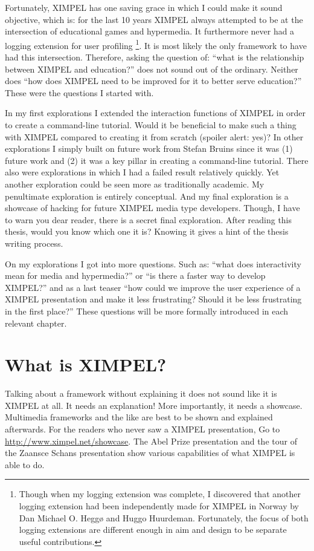 Fortunately, XIMPEL has one saving grace in which I could make it sound objective, which is: for the last 10 years XIMPEL always attempted to be at the intersection of educational games and hypermedia. It furthermore never had a logging extension for user profiling
\footnote{Though when my logging extension was complete, I discovered that another logging extension had been independently made for XIMPEL in Norway by Dan Michael O. Heggø and Huggo Huurdeman. Fortunately, the focus of both logging extensions are different enough in aim and design to be separate useful contributions.}. 
It is most likely the only framework to have had this intersection. Therefore, asking the question of: ``what is the relationship between XIMPEL and education?'' does not sound out of the ordinary. Neither does ``how does XIMPEL need to be improved for it to better serve education?'' These were the questions I started with. 

In my first explorations I extended the interaction functions of XIMPEL in order to create a command-line tutorial. Would it be beneficial to make such a thing with XIMPEL compared to creating it from scratch (spoiler alert: yes)? In other explorations I simply built on future work from Stefan Bruins since it was (1) future work and (2) it was a key pillar in creating a command-line tutorial. There also were explorations in which I had a failed result relatively quickly. Yet another exploration could be seen more as traditionally academic. My penultimate exploration is entirely conceptual. And my final exploration is a showcase of hacking for future XIMPEL media type developers. Though, I have to warn you dear reader, there is a secret final exploration. After reading this thesis, would you know which one it is? Knowing it gives a hint of the thesis writing process.

On my explorations I got into more questions. Such as: ``what does interactivity mean for media and hypermedia?'' or ``is there a faster way to develop XIMPEL?'' and as a last teaser ``how could we improve the user experience of a XIMPEL presentation and make it less frustrating? Should it be less frustrating in the first place?'' These questions will be more formally introduced in each relevant chapter. 

\section{What is XIMPEL?}
Talking about a framework without explaining it does not sound like it is XIMPEL at all. It needs an explanation! More importantly, it needs a showcase. Multimedia frameworks and the like are best to be shown and explained afterwards. For the readers who never saw a XIMPEL presentation, Go to \href{ximpel.net/showcase}{http://www.ximpel.net/showcase}. The Abel Prize presentation and the tour of the Zaansce Schans presentation show various capabilities of what XIMPEL is able to do. 

